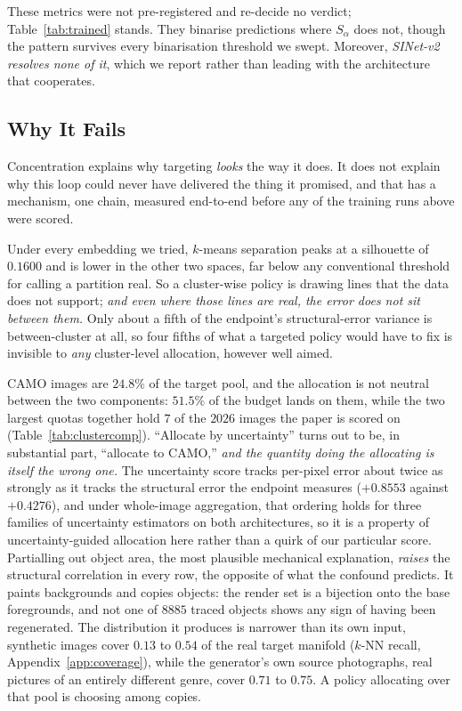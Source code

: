 \documentclass{article}
\begin{document}
These metrics were not pre-registered and re-decide no verdict; Table~\ref{tab:trained} stands. They binarise predictions
where $S_\alpha$ does not, though the pattern survives every binarisation threshold we swept. Moreover, \textit{SINet-v2 resolves none of it}, which we report rather than leading with the architecture
that cooperates.

\subsection{Why It Fails}
\label{sec:why}
Concentration explains why targeting \emph{looks} the way it does. It does not explain why this loop
could never have delivered the thing it promised, and that has a mechanism, one chain, measured end-to-end before any of the training runs above were scored.

Under every embedding we tried, $k$-means separation peaks at a
silhouette of $0.1600$ and is lower in the other two spaces, far below any conventional threshold
for calling a partition real. So a cluster-wise policy is drawing lines that the data does not
support; \textit{and even where those lines are real, the error does not sit between them.} Only
about a fifth of the endpoint's structural-error variance is between-cluster at all, so four fifths
of what a targeted policy would have to fix is invisible to \emph{any} cluster-level allocation,
however well aimed.

CAMO images are $24.8\%$ of the target pool, and the allocation is not neutral between the two components: $51.5\%$
of the budget lands on them, while the two largest quotas together hold $7$ of the $2026$ images the
paper is scored on (Table~\ref{tab:clustercomp}). ``Allocate by uncertainty'' turns out to be, in substantial part, ``allocate
to CAMO,'' \textit{and the quantity doing the allocating is itself the wrong one.} The
uncertainty score tracks per-pixel error about twice as strongly as it tracks the structural error
the endpoint measures ($+0.8553$ against $+0.4276$), and under whole-image aggregation, that ordering
holds for three families of uncertainty estimators on both architectures, so it is a property of uncertainty-guided allocation
here rather than a quirk of our particular score. Partialling out object area, the most plausible
mechanical explanation, \emph{raises} the structural correlation in every row, the opposite of what the confound predicts. It paints backgrounds and copies objects: the render set is a bijection onto the base foregrounds, and not one
of $8885$ traced objects shows any sign of having been regenerated. The distribution it produces is
narrower than its own input, synthetic images cover $0.13$ to $0.54$ of the real target manifold
($k$-NN recall, Appendix~\ref{app:coverage}), while the generator's own source photographs, real
pictures of an entirely different genre, cover $0.71$ to $0.75$. A policy allocating over that pool is choosing among copies.
\end{document}
